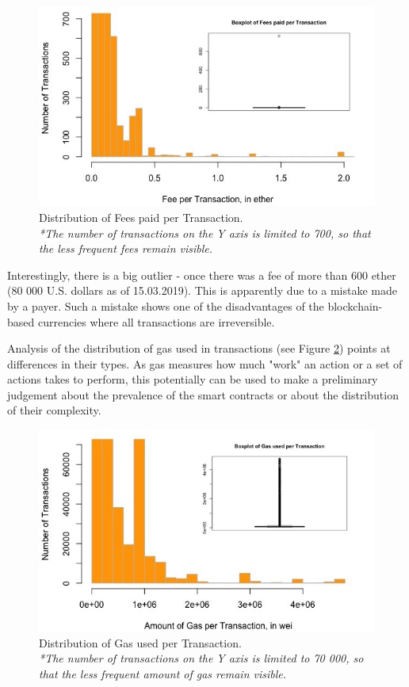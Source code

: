 \begin{figure}[h]
  \centering
  \includegraphics[width=\linewidth]{figures/fee_per_tx.jpeg}
  \caption{Distribution of Fees paid per Transaction.\\ 
  \textit{*The number of transactions on the Y axis is limited to 700, so that the less frequent fees remain visible.}}
  \label{fig:fee_per_tx}
\end{figure}

Interestingly, there is a big outlier - once there was a fee of more than 600 ether (80 000 U.S. dollars as of 15.03.2019).
This is apparently due to a mistake made by a payer.
Such a mistake shows one of the disadvantages of the blockchain-based currencies where all transactions are irreversible.

Analysis of the distribution of gas used in transactions (see Figure \ref{fig:gas_per_tx}) points at differences in their types.
As gas measures how much "work" an action or a set of actions takes to perform, this potentially can be used to make a preliminary judgement about the prevalence of the smart contracts or about the distribution of their complexity.

\begin{figure}[h]
  \centering
  \includegraphics[width=\linewidth]{figures/gas_per_tx.jpeg}
  \caption{Distribution of Gas used per Transaction. \\ 
  \textit{*The number of transactions on the Y axis is limited to 70 000, so that the less frequent amount of gas remain visible.}}
  \label{fig:gas_per_tx}
\end{figure}


